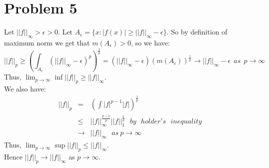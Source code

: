 \documentclass[12pt]{article}
\begin{document}
\clearpage
\section*{Problem 5}
Let $||f||_{\infty} > \epsilon >0$. Let $A_{\epsilon}=\{x: |f(x)| \ge ||f||_{\infty} - \epsilon\}$. So by definition of maximum norm we get that $m(A_{\epsilon}) >0$, so we have: 
$$||f||_p \ge \left(\int_{A_{\epsilon}} 
(||f||_{\infty}-\epsilon)^p \right)^{\frac{1}{p}}
=
(||f||_{\infty}-\epsilon)(m(A_{\epsilon}))^{\frac{1}{p}}
\rightarrow ||f||_{\infty}-\epsilon
\ \ as \ \ p \rightarrow \infty
$$
Thus, $\lim_{p \rightarrow \infty} \inf ||f||_p \ge ||f||_{\infty}$. \\
We also have:
\begin{eqnarray*}
||f||_p &=& 
\left( \int |f|^{p-1}|f| \right)^{\frac{1}{p}}
\\ &\le &
||f||_{\infty}^{\frac{p-1}{p}} ||f||_1^{\frac{1}{p}} \ \ \ by \ \ \ holder's \ \ \ inequality
\\ &\rightarrow &
||f||_{\infty} \ \ \ as \ p \rightarrow \infty
\end{eqnarray*}
Thus, $\lim_{p \rightarrow \infty} \sup ||f||_p \le ||f||_{\infty}$. \\
Hence $||f||_p \rightarrow ||f||_{\infty}$ as $p \rightarrow \infty$.



\clearpage
\end{document}
